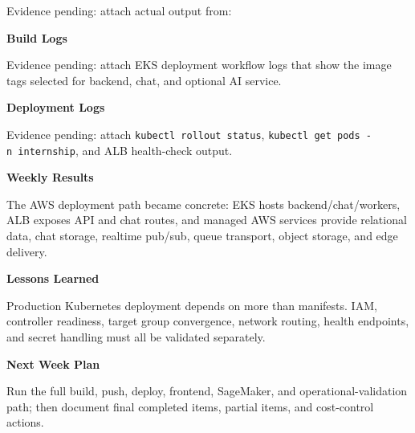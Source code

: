 Evidence pending: attach actual output from:

\begin{Shaded}
\begin{Highlighting}[]
 \OperatorTok{\textless{}}\OperatorTok{\textgreater{}}
\end{Highlighting}
\end{Shaded}

\vspace{0.5em}\noindent\textbf{Build Logs}\par

Evidence pending: attach EKS deployment workflow logs that show the
image tags selected for backend, chat, and optional AI service.

\vspace{0.5em}\noindent\textbf{Deployment Logs}\par

Evidence pending: attach \texttt{kubectl\ rollout\ status},
\texttt{kubectl\ get\ pods\ -n\ internship}, and ALB health-check
output.

\vspace{0.5em}\noindent\textbf{Weekly Results}\par

The AWS deployment path became concrete: EKS hosts backend/chat/workers,
ALB exposes API and chat routes, and managed AWS services provide
relational data, chat storage, realtime pub/sub, queue transport, object
storage, and edge delivery.

\vspace{0.5em}\noindent\textbf{Lessons Learned}\par

Production Kubernetes deployment depends on more than manifests. IAM,
controller readiness, target group convergence, network routing, health
endpoints, and secret handling must all be validated separately.

\vspace{0.5em}\noindent\textbf{Next Week Plan}\par

Run the full build, push, deploy, frontend, SageMaker, and
operational-validation path; then document final completed items,
partial items, and cost-control actions.
